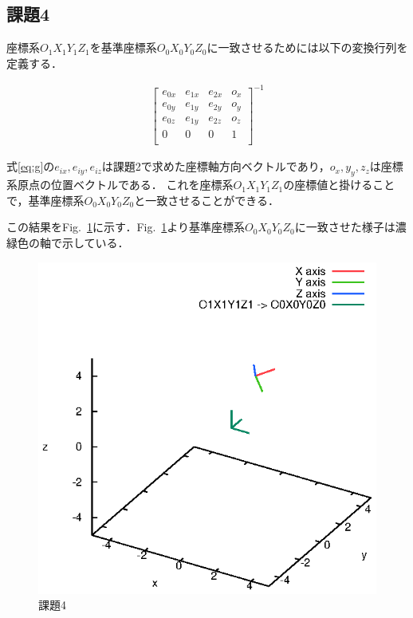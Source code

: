 \documentclass[a4paper,10pt]{jsarticle}
\begin{document}
\subsection{課題4}
座標系$O_1X_1Y_1Z_1$を基準座標系$O_0X_0Y_0Z_0$に一致させるためには以下の変換行列を定義する．

\begin{eqnarray}
\label{eq:g}
  \left[
    \begin{array}{cccc}
      e_{0x} & e_{1x} & e_{2x} & o_x \\
      e_{0y} & e_{1y} & e_{2y} & o_y\\
      e_{0z} & e_{1y} & e_{2z}& o_z\\
      0 & 0 & 0 & 1\\
    \end{array}
  \right]^{-1}
\end{eqnarray}

式\eqref{eq:g}の$e_{ix}, e_{iy}, e_{iz}$は課題2で求めた座標軸方向ベクトルであり，$o_{x}, y_{y}, z_{z}$は座標系原点の位置ベクトルである．
これを座標系$O_1X_1Y_1Z_1$の座標値と掛けることで，基準座標系$O_0X_0Y_0Z_0$と一致させることができる．

この結果をFig.~\ref{fig:課題4}に示す．Fig.~\ref{fig:課題4}より基準座標系$O_0X_0Y_0Z_0$に一致させた様子は濃緑色の軸で示している．

\begin{figure}[htb]
  \begin{center}
    \includegraphics[clip,width=14cm]{fig/eps/4.eps}
  \end{center}
  \caption{課題4}
  \label{fig:課題4}
\end{figure}
\end{document}
